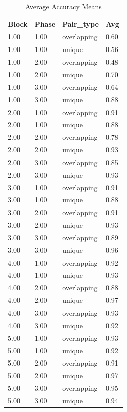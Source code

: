 \documentclass[
  english,
  man]{article}
\begin{document}
\begin{table}[tbp]

\begin{center}
\begin{threeparttable}

\caption{\label{tab:unnamed-chunk-1}Average Accuracy Means}

\begin{tabular}{llll}
\toprule
Block & \multicolumn{1}{c}{Phase} & \multicolumn{1}{c}{Pair\_type} & \multicolumn{1}{c}{Avg}\\
\midrule
1.00 & 1.00 & overlapping & 0.60\\
1.00 & 1.00 & unique & 0.56\\
1.00 & 2.00 & overlapping & 0.48\\
1.00 & 2.00 & unique & 0.70\\
1.00 & 3.00 & overlapping & 0.64\\
1.00 & 3.00 & unique & 0.88\\
2.00 & 1.00 & overlapping & 0.91\\
2.00 & 1.00 & unique & 0.88\\
2.00 & 2.00 & overlapping & 0.78\\
2.00 & 2.00 & unique & 0.93\\
2.00 & 3.00 & overlapping & 0.85\\
2.00 & 3.00 & unique & 0.93\\
3.00 & 1.00 & overlapping & 0.91\\
3.00 & 1.00 & unique & 0.88\\
3.00 & 2.00 & overlapping & 0.91\\
3.00 & 2.00 & unique & 0.93\\
3.00 & 3.00 & overlapping & 0.89\\
3.00 & 3.00 & unique & 0.96\\
4.00 & 1.00 & overlapping & 0.92\\
4.00 & 1.00 & unique & 0.93\\
4.00 & 2.00 & overlapping & 0.88\\
4.00 & 2.00 & unique & 0.97\\
4.00 & 3.00 & overlapping & 0.93\\
4.00 & 3.00 & unique & 0.92\\
5.00 & 1.00 & overlapping & 0.93\\
5.00 & 1.00 & unique & 0.92\\
5.00 & 2.00 & overlapping & 0.91\\
5.00 & 2.00 & unique & 0.97\\
5.00 & 3.00 & overlapping & 0.95\\
5.00 & 3.00 & unique & 0.94\\
\bottomrule
\end{tabular}

\end{threeparttable}
\end{center}

\end{table}
\end{document}

